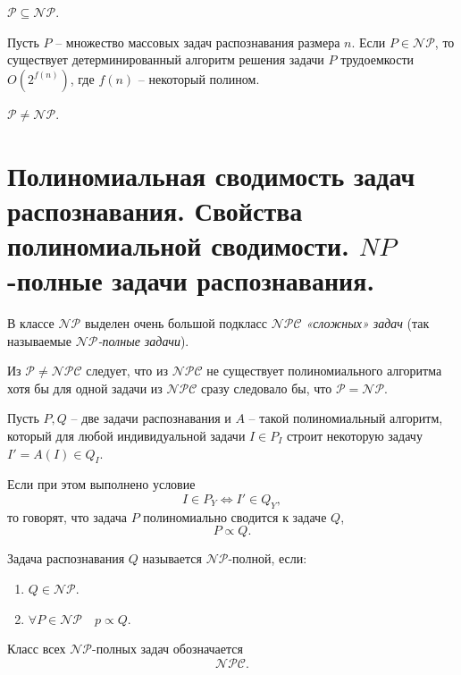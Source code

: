 \begin{theorem}
    $ \mathcal{P} \subseteq \mathcal{NP} $.
\end{theorem}

\begin{theorem}
    Пусть $ P $ -- множество массовых задач распознавания размера $ n $. Если $ P \in \mathcal{NP} $, то существует детерминированный алгоритм решения задачи $ P $ трудоемкости $ O(2^{f(n)}) $, где $ f(n) $ -- некоторый полином.
\end{theorem}

\begin{note}[Гипотеза]
    $ \mathcal{P} \ne \mathcal{NP} $.
\end{note}

\section{Полиномиальная сводимость задач распознавания. Свойства полиномиальной сводимости. $NP$-полные задачи распознавания.}

\begin{note}
    В классе $ \mathcal{NP} $ выделен очень большой подкласс $ \mathcal{NPC} $ \emph{«сложных» задач} (так называемые \emph{$ \mathcal{NP} $-полные задачи}).

    Из $ \mathcal{P}\ne \mathcal{NPC} $ следует, что из $ \mathcal{NPC} $ не существует полиномиального алгоритма хотя бы для одной задачи из $ \mathcal{NPC} $ сразу следовало бы, что $ \mathcal{P} = \mathcal{NP} $.
\end{note}

\begin{definition}
    Пусть $ P,Q $ -- две задачи распознавания и $ A $ -- такой полиномиальный алгоритм, который для любой индивидуальной задачи $ I \in P_I $ строит некоторую задачу $ I'= A(I) \in Q_I $.

    Если при этом выполнено условие
    \[
        I \in P_Y \iff I' \in Q_Y,
    \]
    то говорят, что задача $ P $ полиномиально сводится к задаче $ Q $,
    \[
        P\propto Q.
    \]
\end{definition}

\begin{definition}
    Задача распознавания $ Q $ называется $ \mathcal{NP} $-полной, если:
    \begin{enumerate}
        \item $ Q \in \mathcal{NP} $.
        \item $ \forall P \in \mathcal{NP} \quad p \propto Q $.
    \end{enumerate}

    Класс всех $ \mathcal{NP} $-полных задач обозначается
    \[
        \mathcal{NPC}.
    \]
\end{definition}

